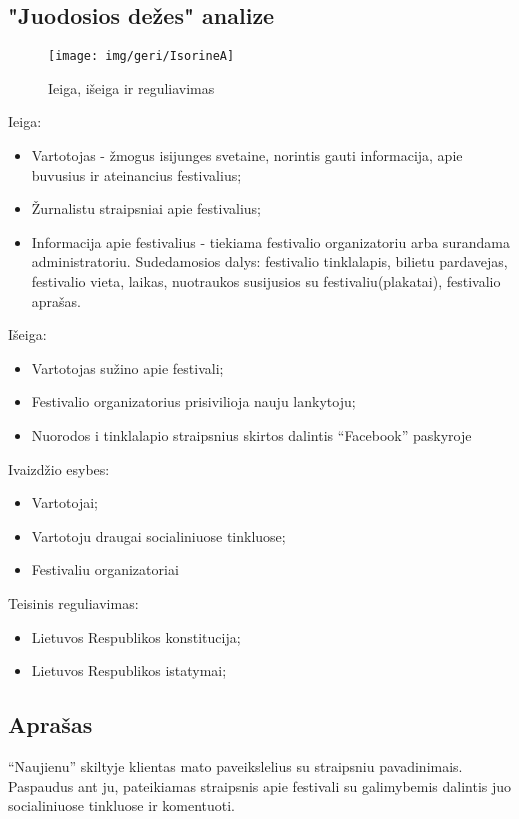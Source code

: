 ﻿\documentclass{VUMIFPSkursinis}
\begin{document}
{\subsection{"Juodosios dežes" analize}
\begin{figure}[H]
    \centering
    \texttt{[image: img/geri/IsorineA]}
    \label{img:uml0}
	\caption{Ieiga, išeiga ir reguliavimas}
\end{figure}
\noindent
Ieiga:
\begin{itemize}
\item Vartotojas - žmogus isijunges svetaine, norintis gauti informacija, apie buvusius ir ateinancius festivalius;
\item Žurnalistu straipsniai apie festivalius;
\item Informacija apie festivalius - tiekiama festivalio organizatoriu arba surandama administratoriu. Sudedamosios dalys: festivalio tinklalapis, bilietu pardavejas, festivalio vieta, laikas, nuotraukos susijusios su festivaliu(plakatai), festivalio aprašas.
\end{itemize}
Išeiga:
\begin{itemize}
\item Vartotojas sužino apie festivali;
\item Festivalio organizatorius prisivilioja nauju lankytoju;
\item Nuorodos i tinklalapio straipsnius skirtos dalintis “Facebook” paskyroje
\end{itemize}
Ivaizdžio esybes:
\begin{itemize}
\item Vartotojai;
\item Vartotoju draugai socialiniuose tinkluose;
\item Festivaliu organizatoriai
\end{itemize}
Teisinis reguliavimas:
\begin{itemize}
\item Lietuvos Respublikos konstitucija;
\item Lietuvos Respublikos istatymai;
\end{itemize}
\subsection{Aprašas}



“Naujienu” skiltyje klientas mato paveikslelius su straipsniu pavadinimais.
Paspaudus ant ju, pateikiamas straipsnis apie festivali su galimybemis dalintis juo socialiniuose tinkluose ir komentuoti. 

}
\end{document}
